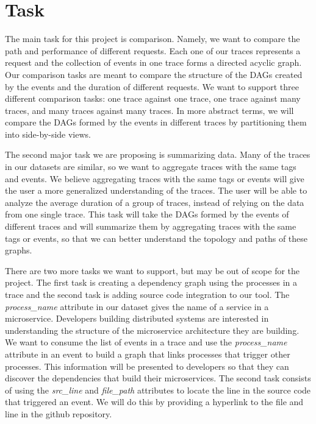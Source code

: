 \section{Task}

The main task for this project is comparison. Namely, we want to compare the path and performance of different
requests. Each one of our traces represents a request and the collection of events in one trace forms a directed acyclic graph. Our
comparison tasks are meant to compare the structure of the DAGs created by the events and the duration of different requests. 
We want to support three different comparison tasks: one trace against one trace, one trace against many traces, and many traces
against many traces. In more abstract terms, we will compare the DAGs formed by the events in different traces by partitioning them
into side-by-side views.

The second major task we are proposing is summarizing data. Many of the traces in our datasets are similar, so we want to
aggregate traces with the same tags and events. We believe aggregating traces with the same tags or events will give the user
a more generalized understanding of the traces. The user will be able to analyze the average duration of a group of traces, instead
of relying on the data from one single trace. This task will take the DAGs formed by the events of different traces and will summarize
them by aggregating traces with the same tags or events, so that we can better understand the topology and paths of these graphs.

There are two more tasks we want to support, but may be out of scope for the project. The first task is creating a dependency graph using
the processes in a trace and the second task is adding source code integration to our tool. The \textit{process\_name} attribute in our dataset gives the name
of a service in a microservice. Developers building distributed systems are interested in understanding the structure of the microservice
architecture they are building. We want to consume the list of events in a trace and use the \textit{process\_name} attribute in an event 
to build a graph that links processes that trigger other processes. This information will be presented to developers so that they can
discover the dependencies that build their microservices. The second task consists of using the \textit{src\_line} and \textit{file\_path}
attributes to locate the line in the source code that triggered an event. We will do this by providing a hyperlink to the file and line
in the github repository. 
